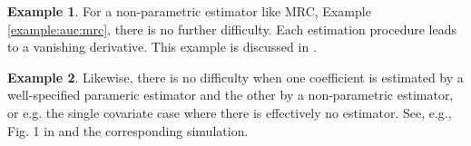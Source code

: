 \documentclass[12pt]{article}
\theoremstyle{definition}
\newtheorem{example}{Example}%
\begin{document}
\begin{example}
  For a non-parametric estimator like MRC, Example \ref{example:auc:mrc}, there
  is no further difficulty. Each estimation procedure leads to a
  vanishing derivative. This example is discussed in \citet{heller2017}.
\end{example}
\begin{example}Likewise, there is no difficulty when one coefficient
  is estimated by a well-specified parameric estimator and the other
  by a non-parametric estimator, or e.g.  the single covariate case
  where there is effectively no estimator. %
See, e.g., Fig. 1 in \citet{demler2017} and the corresponding simulation.
\end{example}

\end{document}
